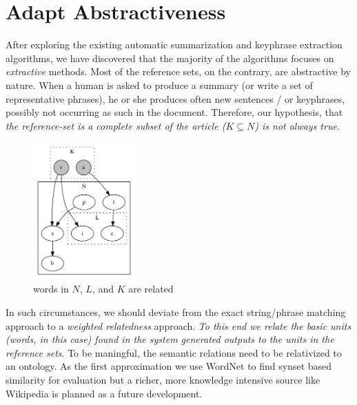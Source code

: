 \documentclass[a4paper]{report}
\begin{document}
\section{Adapt Abstractiveness}
After exploring the existing automatic summarization and keyphrase extraction algorithms, we have discovered that the majority of the algorithms focuses on \emph{extractive} methods. Most of the reference sets, on the contrary, are abstractive by nature. When a human is asked to produce a summary (or write a set of representative phrases), he or she produces often 
new sentences / or keyphrases, possibly not occurring as such in the document. Therefore, our hypothesis, that \emph{the reference-set is a complete subset of the article ($K\subseteq N$) is not always true}. 
\begin{figure}[h]
\centering
\includegraphics[width=0.35\textwidth]{testGraph2}
\vspace{-0.4cm}
\caption{words in $N$, $L$, and $K$ are related}
\end{figure}
\par In such circumstances, we should deviate from the exact string/phrase matching approach to a \emph{weighted relatedness} approach. \emph{To this end we relate the basic units (words, in this case) found in the system generated outputs to the units in the reference sets}. To be maningful, the semantic relations need to be relativized to an ontology. As the first approximation we use WordNet to find synset based similarity for evaluation but a richer, more knowledge intensive
source like Wikipedia is planned as a future development.
\end{document}
